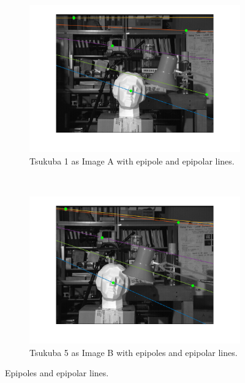 \documentclass[a4paper, 10pt, conference]{ieeeconf}
\begin{document}
\begin{figure}[!ht]
  \captionsetup[subfigure]{position=b}
  \centering
    \begin{subfigure}{0.45\linewidth}
      \includegraphics[width=\textwidth]{pic/q1_3_d_A}
      \caption{Tsukuba 1 as Image A  with epipole and epipolar lines.}
      \label{fig:tsuka}
    \end{subfigure}
    ~
    \begin{subfigure}{0.45\linewidth}
      \includegraphics[width=\textwidth]{pic/q1_3_d_B}
      \caption{Tsukuba 5 as Image B with epipoles and epipolar lines.}
      \label{fig:tsukb}
    \end{subfigure}

	\caption{Epipoles and epipolar lines.}
    \vspace{-0.75cm}
  \label{fig:epipolar}
\end{figure}
\end{document}

